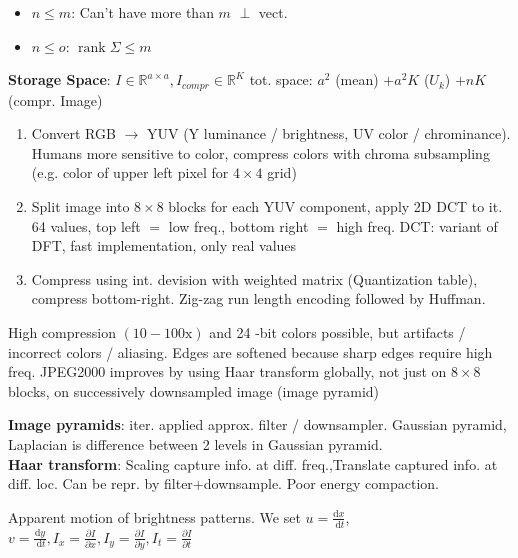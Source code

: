 \begin{itemize}[leftmargin = *,noitemsep]
\item $n\leq m$: Can't have more than $m$ $\perp$ vect. 
\item $n\leq o$: $\operatorname{rank}\Sigma \leq m$
\end{itemize}





\textbf{Storage Space}: $I\in \mathbb{R}^{a\times a}, I_{compr}\in \mathbb{R}^{K}$ tot. space: $a^2$ (mean) $+a^2K$ ($U_{k}$) $+nK$ (compr. Image)

\begin{enumerate}[leftmargin = *,noitemsep]
\item Convert RGB $\rightarrow$ YUV (Y luminance / brightness, UV color / chrominance). Humans more sensitive to color, compress colors with chroma subsampling (e.g. color of upper left pixel for $4 \times 4$ grid)

\item Split image into $8 \times 8$ blocks for each YUV component, apply 2D DCT to it. 64 values, top left $=$ low freq., bottom right $=$ high freq. DCT: variant of DFT, fast implementation, only real values

\item Compress using int. devision with weighted matrix (Quantization table), compress bottom-right. Zig-zag run length encoding followed by Huffman.
\end{enumerate}

High compression $(10-100 \mathrm{x})$ and 24 -bit colors possible, but artifacts / incorrect colors / aliasing. Edges are softened because sharp edges require high freq. JPEG2000 improves by using Haar transform globally, not just on $8 \times 8$ blocks, on successively downsampled image (image pyramid)

\textbf{Image pyramids}: iter. applied approx. filter / downsampler. Gaussian pyramid, Laplacian is difference between 2 levels in Gaussian pyramid.\\
\textbf{Haar transform}: Scaling capture info. at diff. freq.,Translate captured info. at diff. loc. Can be repr. by filter+downsample. Poor energy compaction.



Apparent motion of brightness patterns. We set $u=\frac{\mathrm{d} x}{\mathrm{~d} t}$,$
v=\frac{\mathrm{d} y}{\mathrm{~d} t}, I_x=\frac{\partial I}{\partial x}, I_y=\frac{\partial I}{\partial y}, I_t=\frac{\partial I}{\partial t}$


